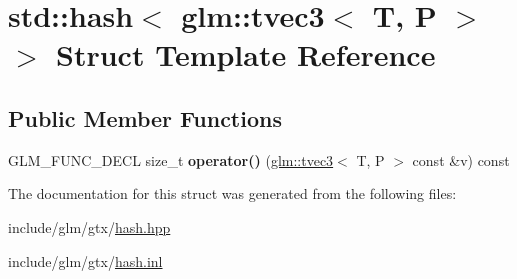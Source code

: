 \hypertarget{structstd_1_1hash_3_01glm_1_1tvec3_3_01T_00_01P_01_4_01_4}{}\section{std\+:\+:hash$<$ glm\+:\+:tvec3$<$ T, P $>$ $>$ Struct Template Reference}
\label{structstd_1_1hash_3_01glm_1_1tvec3_3_01T_00_01P_01_4_01_4}
\subsection*{Public Member Functions}
\begin{DoxyCompactItemize}
\item 
\mbox{\label{structstd_1_1hash_3_01glm_1_1tvec3_3_01T_00_01P_01_4_01_4_af8dd018300b7f9223f6d6a1c92b0adaf}} 
G\+L\+M\+\_\+\+F\+U\+N\+C\+\_\+\+D\+E\+CL size\+\_\+t {\bfseries operator()} (\hyperlink{structglm_1_1tvec3}{glm\+::tvec3}$<$ T, P $>$ const \&v) const
\end{DoxyCompactItemize}


The documentation for this struct was generated from the following files\+:\begin{DoxyCompactItemize}
\item 
include/glm/gtx/\hyperlink{hash_8hpp}{hash.\+hpp}\item 
include/glm/gtx/\hyperlink{hash_8inl}{hash.\+inl}\end{DoxyCompactItemize}
